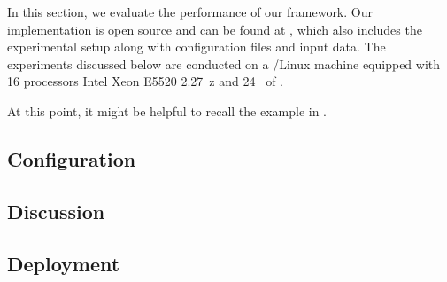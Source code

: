 In this section, we evaluate the performance of our framework. Our
implementation is open source and can be found at \cite{sources}, which also
includes the experimental setup along with configuration files and input data.
The experiments discussed below are conducted on a /Linux machine
equipped with 16 processors Intel Xeon E5520 2.27~z and 24~ of
.

 At this point, it might be helpful to
recall the example in .

\subsection{Configuration} 


\subsection{Discussion}


\subsection{Deployment}

